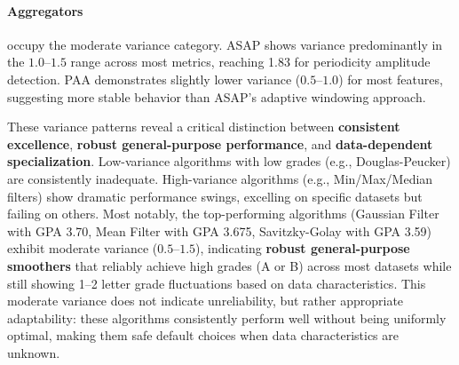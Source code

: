 \paragraph{Aggregators} occupy the moderate variance category. ASAP shows variance predominantly in the $1.0$--$1.5$ range across most metrics, reaching 1.83 for periodicity amplitude detection. PAA demonstrates slightly lower variance ($0.5$--$1.0$) for most features, suggesting more stable behavior than ASAP's adaptive windowing approach.

These variance patterns reveal a critical distinction between \textbf{consistent excellence}, \textbf{robust general-purpose performance}, and \textbf{data-dependent specialization}. Low-variance algorithms with low grades (e.g., Douglas-Peucker) are consistently inadequate. High-variance algorithms (e.g., Min/Max/Median filters) show dramatic performance swings, excelling on specific datasets but failing on others. Most notably, the top-performing algorithms (Gaussian Filter with GPA 3.70, Mean Filter with GPA 3.675, Savitzky-Golay with GPA 3.59) exhibit moderate variance ($0.5$--$1.5$), indicating \textbf{robust general-purpose smoothers} that reliably achieve high grades (A or B) across most datasets while still showing 1--2 letter grade fluctuations based on data characteristics. This moderate variance does not indicate unreliability, but rather appropriate adaptability: these algorithms consistently perform well without being uniformly optimal, making them safe default choices when data characteristics are unknown.
